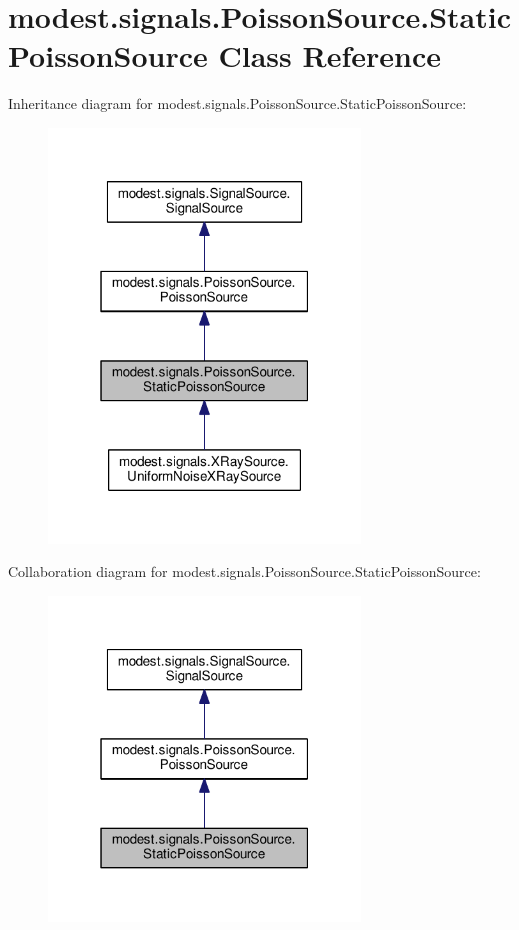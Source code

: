 \hypertarget{classmodest_1_1signals_1_1PoissonSource_1_1StaticPoissonSource}{}\section{modest.\+signals.\+Poisson\+Source.\+Static\+Poisson\+Source Class Reference}
\label{classmodest_1_1signals_1_1PoissonSource_1_1StaticPoissonSource}


Inheritance diagram for modest.\+signals.\+Poisson\+Source.\+Static\+Poisson\+Source\+:
\nopagebreak
\begin{figure}[H]
\begin{center}
\leavevmode
\includegraphics[width=235pt]{classmodest_1_1signals_1_1PoissonSource_1_1StaticPoissonSource__inherit__graph}
\end{center}
\end{figure}


Collaboration diagram for modest.\+signals.\+Poisson\+Source.\+Static\+Poisson\+Source\+:\nopagebreak
\begin{figure}[H]
\begin{center}
\leavevmode
\includegraphics[width=235pt]{classmodest_1_1signals_1_1PoissonSource_1_1StaticPoissonSource__coll__graph}
\end{center}
\end{figure}
